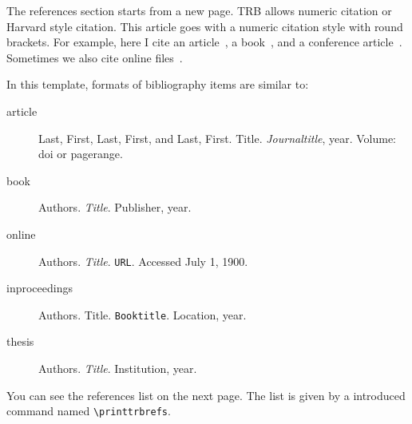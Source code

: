\documentclass[12pt]{trbart}
\begin{document}
The references section starts from a new page. TRB allows numeric citation or Harvard style citation. This article goes with a numeric citation style with round brackets. For example, here I cite an article~\autocite{egarticle}, a book~\autocite{egbook}, and a conference article~\autocite{egconference}. Sometimes we also cite online files~\autocite{egonline}. 

In this template, formats of bibliography items are similar to:
\begin{description}
    \item[article] Last, First, Last, First, and Last, First. Title. \textit{Journaltitle}, year. Volume: doi or pagerange.
    \item[book] Authors. \textit{Title}. Publisher, year.
    \item[online] Authors. \textit{Title}. \texttt{URL}. Accessed July 1, 1900.
    \item[inproceedings] Authors. Title. \texttt{Booktitle}. Location, year.
    \item[thesis] Authors. \textit{Title}. Institution, year. 
\end{description} 

You can see the references list on the next page. The list is given by a introduced command named \verb+\printtrbrefs+.

\printtrbrefs%
\end{document}
